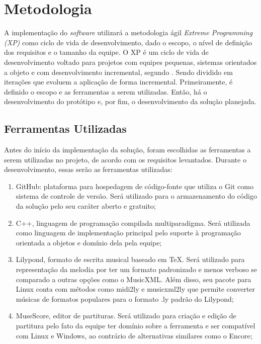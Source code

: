 \chapter[Metodologia]{Metodologia}

  A implementação do \textit{software} utilizará a metodologia ágil \textit{Extreme Programming (XP)} como ciclo de vida de desenvolvimento, dado o escopo, o nível de definição dos requisitos e o tamanho da equipe. O XP é um ciclo de vida de desenvolvimento voltado para projetos com equipes pequenas, sistemas orientados a objeto e com desenvolvimento incremental, segundo . Sendo dividido em iterações que evoluem a aplicação de forma incremental. Primeiramente, é definido o escopo e as ferramentas a serem utilizadas. Então, há o desenvolvimento do protótipo e, por fim, o desenvolvimento da solução planejada.

  \section[Ferramentas Utilizadas]{Ferramentas Utilizadas}

    Antes do início da implementação da solução, foram escolhidas as ferramentas a serem utilizadas no projeto, de acordo com os requisitos levantados. Durante o desenvolvimento, essas serão as ferramentas utilizadas:

  \begin{enumerate}
    \item GitHub\footnotemark {}: plataforma para hospedagem de código-fonte que utiliza o Git como sistema de controle de versão. Será utilizado para o armazenamento do código da solução pelo seu caráter aberto e gratuito;
    \item C++\footnotemark {}, linguagem de programação compilada multiparadigma. Será utilizada como linguagem de implementação principal pelo suporte à programação orientada a objetos e domínio dela pela equipe;
    \item Lilypond\footnotemark {}, formato de escrita musical baseado em TeX. Será utilizado para representação da melodia por ter um formato padronizado e menos verboso se comparado a outras opções como o MusicXML. Além disso, seu pacote para Linux conta com métodos como midi2ly e musicxml2ly que permite converter músicas de formatos populares para o formato .ly padrão do Lilypond;
    \item MuseScore\footnotemark {}, editor de partituras. Será utilizado para criação e edição de partitura pelo fato da equipe ter domínio sobre a ferramenta e ser compatível com Linux e Windows, ao contrário de alternativas similares como o Encore;
  \end{enumerate}

